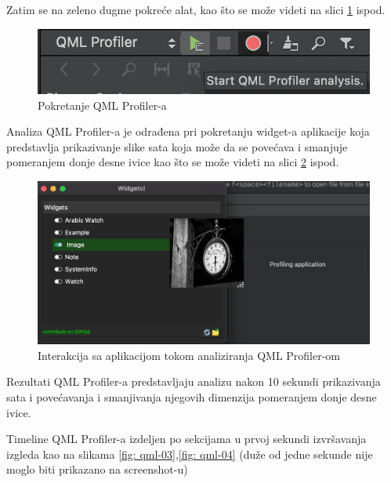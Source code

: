 \documentclass[a4paper]{article}
\begin{document}
Zatim se na zeleno dugme pokreće alat, kao što se može videti na slici \ref{fig: qml-01} ispod.

\begin{figure}[h!]
\begin{center}
\includegraphics[scale=0.45]{qml-prof-01.png}
\end{center}
\caption{Pokretanje QML Profiler-a}
\label{fig: qml-01}
\end{figure}

Analiza QML Profiler-a je odrađena pri pokretanju widget-a aplikacije koja predstavlja prikazivanje slike sata koja može da se povećava i smanjuje pomeranjem donje desne ivice kao što se može videti na slici \ref{fig: qml-02} ispod.

\begin{figure}[h!]
\begin{center}
\includegraphics[scale=0.40]{qml-prof-02.png}
\end{center}
\caption{Interakcija sa aplikacijom tokom analiziranja QML Profiler-om}
\label{fig: qml-02}
\end{figure}

Rezultati QML Profiler-a predstavljaju analizu nakon 10 sekundi prikazivanja sata i povećavanja i smanjivanja njegovih dimenzija pomeranjem donje desne ivice.

Timeline QML Profiler-a izdeljen po sekcijama u prvoj sekundi izvršavanja izgleda kao na slikama \ref{fig: qml-03},\ref{fig: qml-04}  (duže od jedne sekunde nije moglo biti prikazano na screenshot-u)
\end{document}
